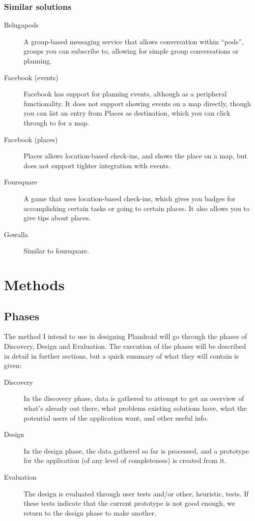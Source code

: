 \documentclass[a4paper,11pt]{report}
\let\oldmarginpar\marginpar
\renewcommand\marginpar[1]{\-\oldmarginpar[\raggedleft\footnotesize #1]%
{\raggedright\footnotesize #1}}
\begin{document}
\subsection{Similar solutions}

\begin{description}
\item[Belugapods] A group-based messaging service that allows conversation
  within ``pods'', groups you can subscribe to, allowing for simple group
  conversations or planning.\cite{site:belugapods}
\item[Facebook (events)] Facebook has support for planning events, although as a
  peripheral functionality. It does not support showing events on a map
  directly, though you can list an entry from Places as destination, which you
  can click through to for a map.\cite{site:facebook}
\item[Facebook (places)] Places allows location-based check-ins, and shows the
  place on a map, but does not support tighter integration with events.\cite{site:facebook}
\item[Foursquare] A game that uses location-based check-ins, which gives you
  badges for accomplishing certain tasks or going to certain places. It also
  allows you to give tips about places.\cite{site:foursquare}
\item[Gowalla] Similar to foursquare.\cite{site:gowalla}\marginpar{Fill out more here}
\end{description}

\chapter{Methods}

\section{Phases}

The method I intend to use in designing Plandroid will go through the phases of
Discovery, Design and Evaluation. The execution of the phases will be described
in detail in further sections, but a quick summary of what they will contain is
given:

\begin{description}
\item[Discovery] In the discovery phase, data is gathered to attempt to get an
  overview of what's already out there, what problems existing solutions have,
  what the potential users of the application want, and other useful info.
\item[Design] In the design phase, the data gathered so far is processed, and a
  prototype for the application (of any level of completeness) is created from
  it.
\item[Evaluation] The design is evaluated through user tests and/or other,
  heuristic, tests. If these tests indicate that the current prototype is not
  good enough, we return to the design phase to make another.
\end{description}
\end{document}
